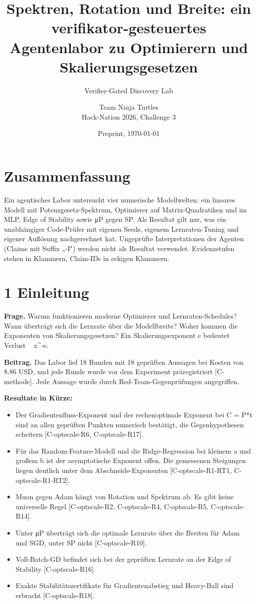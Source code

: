 \documentclass[10pt,twocolumn]{article}
\title{\textbf{Spektren, Rotation und Breite: ein verifikator-gesteuertes Agentenlabor zu Optimierern und Skalierungsgesetzen}}
\author{Verifier-Gated Discovery Lab \and Team Ninja Turtles\\ \small Hack-Nation 2026, Challenge 3}
\date{Preprint, \today}
\begin{document}
\maketitle


\section{Zusammenfassung}

Ein agentisches Labor untersucht vier numerische Modellwelten: ein lineares Modell mit Potenzgesetz-Spektrum, Optimierer auf Matrix-Quadratiken und im MLP, Edge of Stability sowie μP gegen SP. Als Resultat gilt nur, was ein unabhängiger Code-Prüfer mit eigenen Seeds, eigenem Lernraten-Tuning und eigener Auflösung nachgerechnet hat. Ungeprüfte Interpretationen der Agenten (Claims mit Suffix „-I") werden nicht als Resultat verwendet. Evidenzstufen stehen in Klammern, Claim-IDs in eckigen Klammern.

\section{1 Einleitung}

\textbf{Frage.} Warum funktionieren moderne Optimierer und Lernraten-Schedules? Wann überträgt sich die Lernrate über die Modellbreite? Woher kommen die Exponenten von Skalierungsgesetzen? Ein Skalierungsexponent e bedeutet Verlust ~ x^-e.

\textbf{Beitrag.} Das Labor lief 18 Runden mit 18 geprüften Aussagen bei Kosten von 8.86 USD, und jede Runde wurde vor dem Experiment präregistriert {\scriptsize[C-methode]}. Jede Aussage wurde durch Red-Team-Gegenprüfungen angegriffen.

\textbf{Resultate in Kürze:}

\begin{itemize}
\item Der Gradientenfluss-Exponent und der rechenoptimale Exponent bei C = P*t sind an allen geprüften Punkten numerisch bestätigt, die Gegenhypothesen scheitern {\scriptsize[C-optscale-R6, C-optscale-R17]}.
\item Für das Random-Feature-Modell und die Ridge-Regression bei kleinem a und großem b ist der asymptotische Exponent offen. Die gemessenen Steigungen liegen deutlich unter dem Abschneide-Exponenten {\scriptsize[C-optscale-R1-RT1, C-optscale-R1-RT2]}.
\item Muon gegen Adam hängt von Rotation und Spektrum ab. Es gibt keine universelle Regel {\scriptsize[C-optscale-R2, C-optscale-R4, C-optscale-R5, C-optscale-R14]}.
\item Unter μP überträgt sich die optimale Lernrate über die Breiten für Adam und SGD, unter SP nicht {\scriptsize[C-optscale-R10]}.
\item Voll-Batch-GD befindet sich bei der geprüften Lernrate an der Edge of Stability {\scriptsize[C-optscale-R16]}.
\item Exakte Stabilitätszertifikate für Gradientenabstieg und Heavy-Ball sind erbracht {\scriptsize[C-optscale-R18]}.
\end{itemize}
\end{document}
